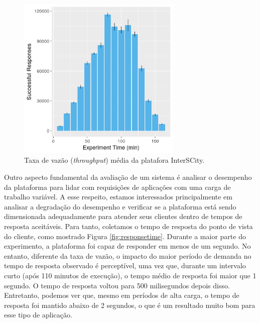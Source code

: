 \begin{figure}[ht]
	\centering
	\includegraphics[width=0.7\textwidth]{figuras/throughput.png}
    \caption{Taxa de vazão (\textit{throughput}) média da platafora InterSCity.}
	\label{fig:throughput}
\end{figure}


Outro aspecto fundamental da avaliação de um sistema é analisar o desempenho da plataforma para lidar com requisições de aplicações com uma carga de trabalho variável.
A esse respeito, estamos interessados principalmente em analisar a degradação do desempenho e verificar se a plataforma está sendo dimensionada adequadamente para atender seus clientes dentro de tempos
de resposta aceitáveis.
Para tanto, coletamos o tempo de resposta do ponto de vista do cliente, como mostrado Figura \ref{fig:responsetime}.
Durante a maior parte do experimento, a plataforma foi capaz de responder em menos de um segundo.
No entanto, diferente da taxa de vazão, o impacto do maior período de demanda no tempo de resposta observado é perceptível, uma vez que, durante um intervalo curto (após 110 minutos de execução),
o tempo médio de resposta foi maior que 1 segundo.
O tempo de resposta voltou para 500 milisegundos depois disso.
Entretanto, podemos ver que, mesmo em períodos de alta carga, o tempo de resposta foi mantido abaixo de 2 segundos, o que é um resultado muito bom para esse tipo de aplicação.

